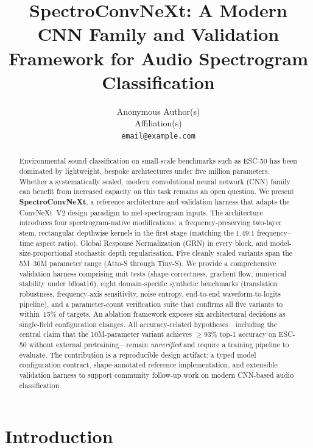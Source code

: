 \documentclass{article}
\title{SpectroConvNeXt: A Modern CNN Family and Validation Framework for Audio Spectrogram Classification}
\author{%
  Anonymous Author(s) \\
  Affiliation(s) \\
  \texttt{email@example.com} \\
}
\begin{document}
\maketitle

\begin{abstract}
Environmental sound classification on small-scale benchmarks such as ESC-50 has
been dominated by lightweight, bespoke architectures under five million
parameters. Whether a systematically scaled, modern convolutional neural network
(CNN) family can benefit from increased capacity on this task remains an open
question. We present \textbf{SpectroConvNeXt}, a reference architecture and
validation harness that adapts the ConvNeXt~V2 design paradigm to mel-spectrogram
inputs. The architecture introduces four spectrogram-native modifications: a
frequency-preserving two-layer stem, rectangular depthwise kernels in the first
stage (matching the 1.49:1 frequency--time aspect ratio), Global Response
Normalization (GRN) in every block, and model-size-proportional stochastic depth
regularisation. Five cleanly scaled variants span the 5M--30M parameter range
(Atto-S through Tiny-S). We provide a comprehensive validation harness comprising
unit tests (shape correctness, gradient flow, numerical stability under bfloat16),
eight domain-specific synthetic benchmarks (translation robustness, frequency-axis
sensitivity, noise entropy, end-to-end waveform-to-logits pipeline), and a
parameter-count verification suite that confirms all five variants to
within~15\% of targets. An ablation framework exposes six architectural decisions
as single-field configuration changes. All accuracy-related hypotheses---including
the central claim that the 10M-parameter variant achieves $\geq 93\%$ top-1
accuracy on ESC-50 without external pretraining---remain \emph{unverified} and
require a training pipeline to evaluate. The contribution is a reproducible
design artifact: a typed model configuration contract, shape-annotated reference
implementation, and extensible validation harness to support community follow-up
work on modern CNN-based audio classification.
\end{abstract}

\section{Introduction}
\end{document}
